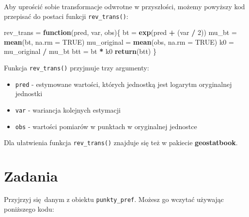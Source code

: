 \documentclass[
  paper=6in:9in,pagesize=pdftex,headinclude=on,footinclude=on,10pt]{scrbook}
\newenvironment{Shaded}{\begin{snugshade}}{\end{snugshade}}
\newcommand{\AttributeTok}[1]{\textcolor[rgb]{0.13,0.29,0.53}{#1}}
\newcommand{\ConstantTok}[1]{\textcolor[rgb]{0.56,0.35,0.01}{#1}}
\newcommand{\ControlFlowTok}[1]{\textcolor[rgb]{0.13,0.29,0.53}{\textbf{#1}}}
\newcommand{\DecValTok}[1]{\textcolor[rgb]{0.00,0.00,0.81}{#1}}
\newcommand{\FunctionTok}[1]{\textcolor[rgb]{0.13,0.29,0.53}{\textbf{#1}}}
\newcommand{\NormalTok}[1]{#1}
\newcommand{\OtherTok}[1]{\textcolor[rgb]{0.56,0.35,0.01}{#1}}
\newcommand{\SpecialCharTok}[1]{\textcolor[rgb]{0.81,0.36,0.00}{\textbf{#1}}}
\providecommand{\tightlist}{%
  \setlength{\itemsep}{0pt}\setlength{\parskip}{0pt}}
\begin{document}
\begin{Shaded}
\end{Shaded}

Aby uprościć sobie transformacje odwrotne w przyszłości, możemy powyższy kod przepisać do postaci funkcji \texttt{rev\_trans()}:

\begin{Shaded}
\begin{Highlighting}[]
\NormalTok{rev\_trans }\OtherTok{=} \ControlFlowTok{function}\NormalTok{(pred, var, obs)\{}
\NormalTok{        bt }\OtherTok{=} \FunctionTok{exp}\NormalTok{(pred }\SpecialCharTok{+}\NormalTok{ (var }\SpecialCharTok{/} \DecValTok{2}\NormalTok{))}
\NormalTok{        mu\_bt }\OtherTok{=} \FunctionTok{mean}\NormalTok{(bt, }\AttributeTok{na.rm =} \ConstantTok{TRUE}\NormalTok{)}
\NormalTok{        mu\_original }\OtherTok{=} \FunctionTok{mean}\NormalTok{(obs, }\AttributeTok{na.rm =} \ConstantTok{TRUE}\NormalTok{)}
\NormalTok{        k0 }\OtherTok{=}\NormalTok{ mu\_original }\SpecialCharTok{/}\NormalTok{ mu\_bt}
\NormalTok{        btt }\OtherTok{=}\NormalTok{ bt }\SpecialCharTok{*}\NormalTok{ k0}
        \FunctionTok{return}\NormalTok{(btt)}
\NormalTok{\}}
\end{Highlighting}
\end{Shaded}

Funkcja \texttt{rev\_trans()} przyjmuje trzy argumenty:

\begin{itemize}
\tightlist
\item
  \texttt{pred} - estymowane wartości, których jednostką jest logarytm oryginalnej jednostki
\item
  \texttt{var} - wariancja kolejnych estymacji
\item
  \texttt{obs} - wartości pomiarów w punktach w oryginalnej jednostce
\end{itemize}

Dla ułatwienia funkcja \texttt{rev\_trans()} znajduje się też w pakiecie \textbf{geostatbook}.

\section{Zadania}\label{z3}

Przyjrzyj się~danym z obiektu \texttt{punkty\_pref}.
Możesz go wczytać używając poniższego kodu:
\end{document}
